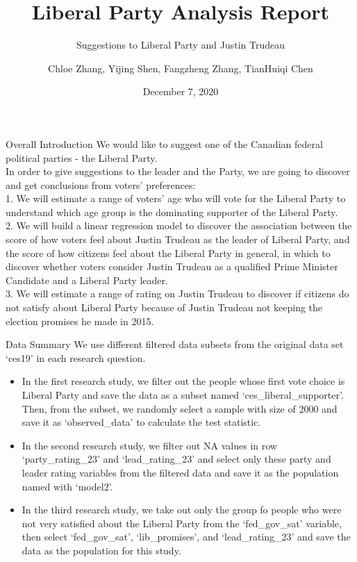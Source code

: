 \documentclass[
  ignorenonframetext,
]{beamer}
\title{Liberal Party Analysis Report}
\subtitle{Suggestions to Liberal Party and Justin Trudeau}
\author{Chloe Zhang, Yijing Shen, Fangzheng Zhang, TianHuiqi Chen}
\date{December 7, 2020}
\begin{document}
\frame{\titlepage}

\begin{frame}{Overall Introduction}
\protect\hypertarget{overall-introduction}{}
We would like to suggest one of the Canadian federal political parties -
the Liberal Party.\\
In order to give suggestions to the leader and the Party, we are going
to discover and get conclusions from voters' preferences:\\
1. We will estimate a range of voters' age who will vote for the Liberal
Party to understand which age group is the dominating supporter of the
Liberal Party.\\
2. We will build a linear regression model to discover the association
between the score of how voters feel about Justin Trudeau as the leader
of Liberal Party, and the score of how citizens feel about the Liberal
Party in general, in which to discover whether voters consider Justin
Trudeau as a qualified Prime Minister Candidate and a Liberal Party
leader.\\
3. We will estimate a range of rating on Justin Trudeau to discover if
citizens do not satisfy about Liberal Party because of Justin Trudeau
not keeping the election promises he made in 2015.\\
\end{frame}

\begin{frame}{Data Summary}
\protect\hypertarget{data-summary}{}
We use different filtered data subsets from the original data set
`ces19' in each research question.\\

\begin{itemize}
\item
  In the first research study, we filter out the people whose first vote
  choice is Liberal Party and save the data as a subset named
  `ces\_liberal\_supporter'. Then, from the subset, we randomly select a
  sample with size of 2000 and save it as `observed\_data' to calculate
  the test statistic.\\
\item
  In the second research study, we filter out NA values in row
  `party\_rating\_23' and `lead\_rating\_23' and select only these party
  and leader rating variables from the filtered data and save it as the
  population named with `model2'.\\
\item
  In the third research study, we take out only the group fo people who
  were not very satisfied about the Liberal Party from the
  `fed\_gov\_sat' variable, then select `fed\_gov\_sat',
  `lib\_promises', and `lead\_rating\_23' and save the data as the
  population for this study.
\end{itemize}
\end{frame}
\end{document}
